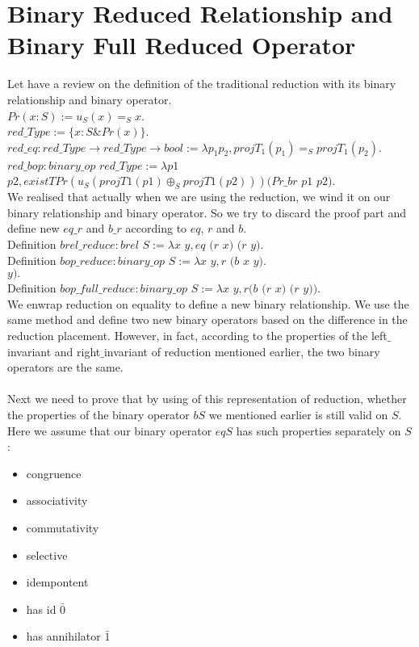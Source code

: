 \documentclass[a4paper,12pt,twoside,openright]{report}
\begin{document}
\section{Binary Reduced Relationship and Binary Full Reduced Operator}
Let have a review on the definition of the traditional reduction with its binary relationship and binary operator.\\
$Pr (x : S) :=   u_S (x) =_S x$.\\
$red\_Type := \{x : S \& Pr(x)\}$.\\
$red\_eq : red\_Type \rightarrow red\_Type \rightarrow bool 
:= \lambda p_1 p_2, projT_1 (p_1) =_S projT_1 (p_2)$.\\
$red\_bop : binary\_op$ $red\_Type :=
    λ p1$ $p2,  existT Pr (u_S(projT1 (p1) \oplus_S projT1 (p2))) (Pr\_br$ $p1$ $p2)$.\\
We realised that actually when we are using the reduction, we wind it on our binary relationship and binary operator. 
So we try to discard the proof part and define new $eq\_r$ and $b\_r$ according to $eq$, $r$ and $b$.\\
Definition $brel\_reduce : brel$ $S := \lambda x$ $y,  eq$ $(r$ $x)$ $(r$ $y).$ \\
Definition $bop\_reduce : binary\_op$ $S := \lambda x$ $y,  r$ $(b$ $x$ $y).$\\
$y).$\\   
Definition $bop\_full\_reduce : binary\_op$ $S := \lambda x$ $y,  r(b$ $(r$ $x)$ $(r$ $y)).$\\
We enwrap reduction on equality to define a new binary relationship. 
We use the same method and define two new binary operators based on the difference in the reduction placement.
However, in fact, according to the properties of the left$\_$invariant and right$\_$invariant of reduction mentioned earlier, the two binary operators are the same.\\\\
Next we need to prove that by using of this representation of reduction, whether the properties of the binary operator $bS$ we mentioned earlier is still valid on $S$.
Here we assume that our binary operator $eqS$ has such properties separately on $S$:
\begin{itemize}
\item congruence 
\item associativity 
\item commutativity 
\item selective 
\item idempontent 
\item has id $\bar0$ 
\item has annihilator $\bar1$ 
\end{itemize}
\end{document}
